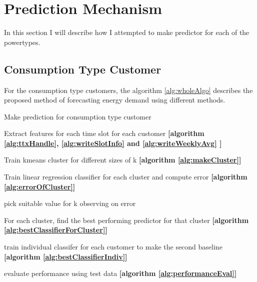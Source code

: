 \section{Prediction Mechanism}

In this section I will describe how I attempted to make predictor for each of the powertypes.

\subsection{Consumption Type Customer}
For the consumption type customers, the algorithm \ref{alg:wholeAlgo} describes the proposed method of forecasting energy demand using different methods. 


\begin{algorithm}
\caption{Make prediction for consumption type customer}
\begin{algorithmic}[1]
\STATE Extract features for each time slot for each customer \textbf{[algorithm \ref{alg:ttxHandle}, \ref{alg:writeSlotInfo} and \ref{alg:writeWeeklyAvg} ] }

\STATE Train kmeans cluster for different sizes of k \textbf{[algorithm \ref{alg:makeCluster}]} 

\STATE Train linear regression classifier for each cluster and compute error \textbf{[algorithm \ref{alg:errorOfCluster}]}

\STATE pick suitable value for k observing on error
 
\STATE For each cluster, find the best performing predictor for that cluster \textbf{[algorithm \ref{alg:bestClassifierForCluster}]} 

\STATE train individual classifer for each customer to make the second baseline \textbf{[algorithm \ref{alg:bestClassifierIndiv}]}

\STATE evaluate performance using test data \textbf{[algorithm \ref{alg:performanceEval}]}  
\end{algorithmic}
\label{alg:wholeAlgo}
\end{algorithm}

